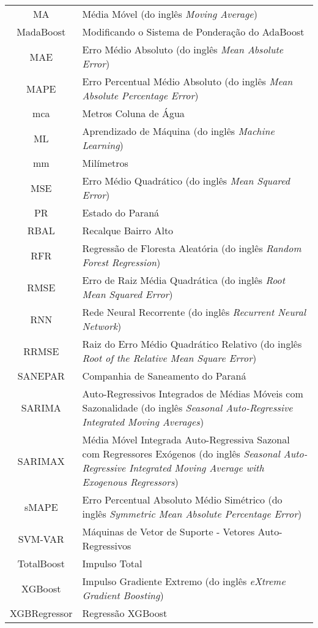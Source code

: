 \begin{tabular}{cp{}}
	MA & Média Móvel (do inglês \textit{Moving Average})\\
	MadaBoost & Modificando o Sistema de Ponderação do AdaBoost\\
	MAE & Erro Médio Absoluto (do inglês \textit{Mean Absolute Error})\\
	MAPE & Erro Percentual Médio Absoluto (do inglês \textit{Mean Absolute Percentage Error})\\
	mca & Metros Coluna de Água\\
	ML & Aprendizado de Máquina (do inglês \textit{Machine Learning})\\
	mm & Milímetros\\
	MSE & Erro Médio Quadrático (do inglês \textit{Mean Squared Error})\\
	PR & Estado do Paraná\\
	RBAL & Recalque Bairro Alto\\
	RFR & Regressão de Floresta Aleatória (do inglês \textit{Random Forest Regression})\\
	RMSE & Erro de Raiz Média Quadrática (do inglês \textit{Root Mean Squared Error})\\
	RNN & Rede Neural Recorrente (do inglês \textit{Recurrent Neural Network})\\
	RRMSE & Raiz do Erro Médio Quadrático Relativo (do inglês \textit{Root of the Relative Mean Square Error})\\
	SANEPAR & Companhia de Saneamento do Paraná \\
	SARIMA & Auto-Regressivos Integrados de Médias Móveis com Sazonalidade (do inglês \textit{Seasonal Auto-Regressive Integrated Moving Averages}) \\
	SARIMAX & Média Móvel Integrada Auto-Regressiva Sazonal com Regressores Exógenos (do inglês \textit{Seasonal Auto-Regressive Integrated Moving Average with Exogenous Regressors}) \\
	sMAPE &  Erro Percentual Absoluto Médio Simétrico (do inglês \textit{Symmetric Mean Absolute Percentage Error})\\
	SVM-VAR & Máquinas de Vetor de Suporte - Vetores Auto-Regressivos\\
	TotalBoost & Impulso Total\\
	XGBoost & Impulso Gradiente Extremo (do inglês \textit{eXtreme Gradient Boosting})\\
	XGBRegressor & Regressão XGBoost	
\end{tabular}